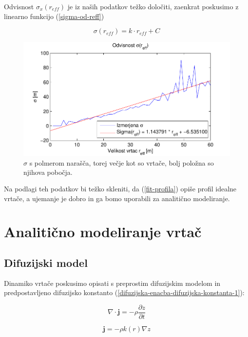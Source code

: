 \documentclass[a4paper, oneside, 12pt]{book}
\begin{document}
Odvisnost $\sigma_x(r_{eff})$ je iz naših podatkov težko določiti, zaenkrat poskusimo z linearno funkcijo (\ref{sigma-od-reff})


\begin{equation}
  \sigma (r_{eff}) = k \cdot r_{eff} + C
  \label{sigma-od-reff}
\end{equation}

\begin{figure}[H]
  \centering
  \includegraphics{slike/menisija-sigme}
  \caption{$\sigma$ s polmerom narašča, torej večje kot so vrtače, bolj položna so njihova pobočja.}
  \label{fig:menisija-sigma}
\end{figure}

Na podlagi teh podatkov bi težko skleniti, da (\ref{fit-profila}) opiše profil idealne vrtače, a ujemanje je dobro in ga bomo uporabili za analitično modeliranje. 


\chapter{Analitično modeliranje vrtač}
\label{analiticno-modeliranje}

\section{Difuzijski model}

Dinamiko vrtače poskusimo opisati s preprostim difuzijskim modelom in predpostavljeno difuzijsko konstanto (\ref{difuzijska-enacba-difuzijska-konstanta-1}):

\begin{equation}
  \nabla \cdot \mathbf{j} = - \rho \frac{\partial z}{\partial t}
  \label{difuzijska-enacba-1}
\end{equation}

\begin{equation}
  \mathbf{j} = - \rho k(r) \nabla z
  \label{difuzijska-enacba-tok}
\end{equation}
\end{document}
